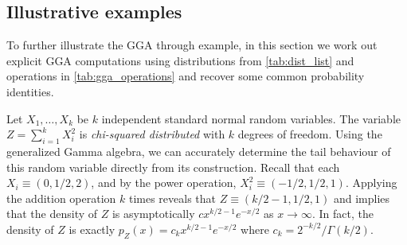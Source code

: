 \documentclass[../thesis.tex]{subfiles}
\begin{document}

\subsection{Illustrative examples}\label{sec:addtl_eg}

To further illustrate the GGA through example, in this section we work
out explicit GGA computations using distributions
from \cref{tab:dist_list} and operations in \cref{tab:gga_operations}
and recover some common probability identities.

\begin{example}
  Let $X_1,\dots,X_k$ be $k$ independent standard normal random variables. The variable $Z = \sum_{i=1}^k X_i^2$ is \emph{chi-squared distributed} with $k$ degrees of freedom. Using the generalized Gamma algebra, we can accurately determine the tail behaviour of this random variable directly from its construction. Recall that each $X_i \equiv (0,1/2,2)$, and by the power operation, $X_i^2 \equiv (-1/2,1/2,1)$. Applying the addition operation $k$ times reveals that $Z \equiv (k/2-1,1/2,1)$ and implies that the density of $Z$ is asymptotically $c x^{k/2-1} e^{-x / 2}$ as $x \to \infty$. In fact, the density of $Z$ is exactly $p_Z(x) = c_k x^{k/2-1} e^{-x/2}$ where $c_k = 2^{-k/2} / \Gamma(k/2)$.
\end{example}
\end{document}
